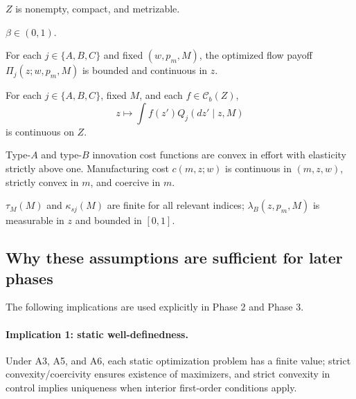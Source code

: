\begin{assumption}
$Z$ is nonempty, compact, and metrizable.
\end{assumption}

\begin{assumption}[A2: Discounting]
$\beta\in(0,1)$.
\end{assumption}

\begin{assumption}
For each $j\in\{A,B,C\}$ and fixed $(w,p_m,M)$, the optimized flow payoff $\Pi_j(z;w,p_m,M)$ is bounded and continuous in $z$.
\end{assumption}

\begin{assumption}
For each $j\in\{A,B,C\}$, fixed $M$, and each $f\in\mathcal C_b(Z)$,
\[
z\mapsto \int f(z')Q_j(dz'\mid z,M)
\]
is continuous on $Z$.
\end{assumption}

\begin{assumption}
Type-$A$ and type-$B$ innovation cost functions are convex in effort with elasticity strictly above one. Manufacturing cost $c(m,z;w)$ is continuous in $(m,z,w)$, strictly convex in $m$, and coercive in $m$.
\end{assumption}

\begin{assumption}
$\tau_M(M)$ and $\kappa_{sj}(M)$ are finite for all relevant indices; $\lambda_B(z,p_m,M)$ is measurable in $z$ and bounded in $[0,1]$.
\end{assumption}

\subsection{Why these assumptions are sufficient for later phases}

The following implications are used explicitly in Phase 2 and Phase 3.

\paragraph{Implication 1: static well-definedness.}
Under A3, A5, and A6, each static optimization problem has a finite value; strict convexity/coercivity ensures existence of maximizers, and strict convexity in control implies uniqueness when interior first-order conditions apply.

